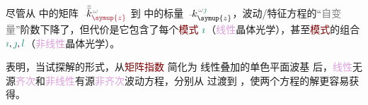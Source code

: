 尽管从  中的矩阵 $\Xint{\begin{smallmatrix} ~ \\ {}^{}_{\mathcolor{gray}{-}} \\ ~ \end{smallmatrix}}{15}{\bar{\bar{k}}}_{\textcolor{Maroon}{\symup{z}}}^{\;\! \mathcolor{gray}{\omega}}$ 到  中的标量 $\Xint{\begin{smallmatrix} ~ \\ {}^{}_{\mathcolor{gray}{-}} \\ ~ \end{smallmatrix}}{15}{k}_{\symup{z}}^{\;\! \mathcolor{gray}{\omega} \textcolor{PineGreen}{\jmath}}$，波动/\textcolor{PineGreen}{特征方程}的“\textcolor{gray}{自变量}”阶数下降了，但代价是它包含了每个\textcolor{Maroon}{模式} $\textcolor{PineGreen}{\imath}$（\textcolor{Plum}{线性}\textcolor{PineGreen}{晶体光学}），甚至\textcolor{Maroon}{模式}的组合 $\textcolor{PineGreen}{\imath},\textcolor{PineGreen}{\jmath},\textcolor{PineGreen}{l}$（\textcolor{Plum}{非线性}\textcolor{PineGreen}{晶体光学}）。

 表明，当试探解的形式，从\textcolor{Maroon}{矩阵指数}  简化为 \textcolor{PineGreen}{线性叠加的单色平面波基} 后，\textcolor{Plum}{线性}\textcolor{NavyBlue}{无源}\textcolor{Plum}{齐次}和\textcolor{Plum}{非线性}\textcolor{NavyBlue}{有源}\textcolor{Plum}{非齐次}波动方程，分别从  过渡到 ，使两个方程的解更容易获得。


